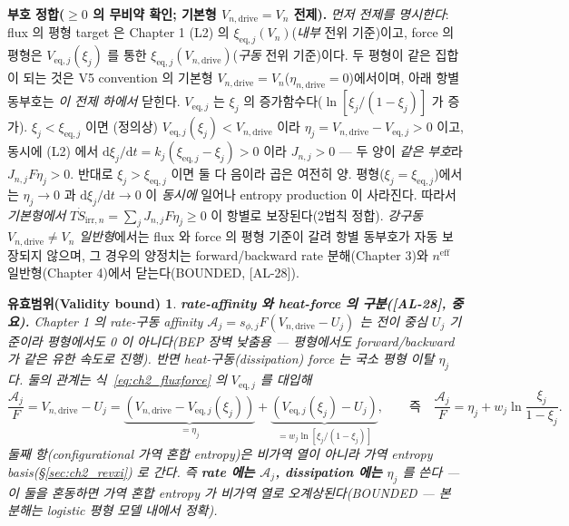 \documentclass[11pt,a4paper]{article}
\newtheorem*{boundbox}{유효범위(Validity bound)}
\newcommand{\dd}{\mathrm{d}}
\newcommand{\eff}{\mathrm{eff}}
\newcommand{\eq}{\mathrm{eq}}
\newcommand{\drive}{\mathrm{drive}}
\newcommand{\irr}{\mathrm{irr}}
\newcommand{\AL}[1]{\textsf{[AL-#1]}}
\begin{document}
\textbf{부호 정합($\ge0$ 의 무비약 확인; 기본형 $V_{n,\drive}=V_n$ 전제).} \emph{먼저 전제를 명시한다}: flux 의
평형 target 은 Chapter 1 (L2) 의 $\xi_{\eq,j}(V_n)$(\emph{내부} 전위 기준)이고, force 의 평형은 $V_{\eq,j}(\xi_j)$
를 통한 $\xi_{\eq,j}(V_{n,\drive})$(\emph{구동} 전위 기준)이다. 두 평형이 같은 집합이 되는 것은 V5 convention
의 기본형 $V_{n,\drive}=V_n$($\eta_{n,\drive}=0$)에서이며, 아래 항별 동부호는 \emph{이 전제 하에서} 닫힌다.
$V_{\eq,j}$ 는 $\xi_j$ 의 증가함수다($\ln[\xi_j/(1-\xi_j)]$ 가 증가).
$\xi_j<\xi_{\eq,j}$ 이면 (정의상) $V_{\eq,j}(\xi_j)<V_{n,\drive}$ 이라 $\eta_j=V_{n,\drive}-V_{\eq,j}>0$
이고, 동시에 (L2) 에서 $\dd\xi_j/\dd t=k_j(\xi_{\eq,j}-\xi_j)>0$ 이라 $J_{n,j}>0$ — 두 양이 \emph{같은 부호}라
$J_{n,j}F\eta_j>0$. 반대로 $\xi_j>\xi_{\eq,j}$ 이면 둘 다 음이라 곱은 여전히 양. 평형($\xi_j=\xi_{\eq,j}$)에서는
$\eta_j\to0$ 과 $\dd\xi_j/\dd t\to0$ 이 \emph{동시에} 일어나 entropy production 이 사라진다. 따라서
\emph{기본형에서} $T\dot S_{\irr,n}=\sum_j J_{n,j}F\eta_j\ge0$ 이 항별로 보장된다(2법칙 정합). \emph{강구동
$V_{n,\drive}\ne V_n$ 일반형}에서는 flux 와 force 의 평형 기준이 갈려 항별 동부호가 자동 보장되지 않으며, 그 경우의
양정치는 forward/backward rate 분해(Chapter 3)와 $n^\eff$ 일반형(Chapter 4)에서 닫는다(BOUNDED, \AL{28}).
\begin{boundbox}
\textbf{rate-affinity 와 heat-force 의 구분(\AL{28}, 중요).} Chapter 1 의 \emph{rate-구동} affinity
$\mathcal A_j=s_{\phi,j}F(V_{n,\drive}-U_j)$ 는 전이 \emph{중심} $U_j$ 기준이라 평형에서도 0 이 아니다(BEP
장벽 낮춤용 — 평형에서도 forward/backward 가 같은 유한 속도로 진행). 반면 \emph{heat-구동}(dissipation)
force 는 국소 평형 이탈 $\eta_j$ 다. 둘의 관계는 식~\eqref{eq:ch2_fluxforce} 의 $V_{\eq,j}$ 를 대입해
\begin{equation*}
\frac{\mathcal A_j}{F}=V_{n,\drive}-U_j=\underbrace{(V_{n,\drive}-V_{\eq,j}(\xi_j))}_{=\eta_j}+\underbrace{(V_{\eq,j}(\xi_j)-U_j)}_{=w_j\ln[\xi_j/(1-\xi_j)]},
\qquad\text{즉}\quad\frac{\mathcal A_j}{F}=\eta_j+w_j\ln\frac{\xi_j}{1-\xi_j}.
\end{equation*}
둘째 항(configurational 가역 혼합 entropy)은 \emph{비가역 열이 아니라} 가역 entropy basis(\S\ref{sec:ch2_revxi})
로 간다. 즉 \textbf{rate 에는 $\mathcal A_j$, dissipation 에는 $\eta_j$} 를 쓴다 — 이 둘을 혼동하면 가역 혼합
entropy 가 비가역 열로 오계상된다(BOUNDED — 본 분해는 logistic 평형 모델 내에서 정확).
\end{boundbox}
\end{document}
